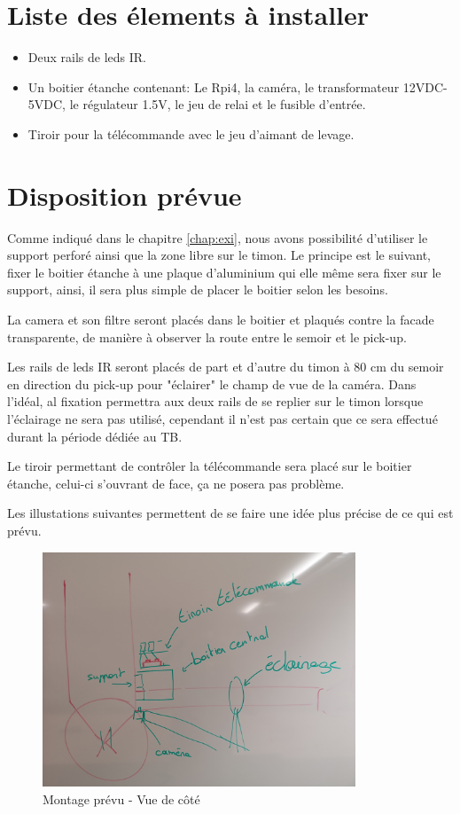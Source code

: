 \section{Liste des élements à installer}
\begin{itemize}
    \item Deux rails de leds IR.
    \item Un boitier étanche contenant: Le Rpi4, la caméra, le transformateur 12VDC-5VDC, le régulateur 1.5V, le jeu de relai et le fusible d'entrée.
    \item Tiroir pour la télécommande avec le jeu d'aimant de levage.
\end{itemize}
\section{Disposition prévue}
Comme indiqué dans le chapitre \ref{chap:exi}, nous avons possibilité d'utiliser le support perforé ainsi que la zone libre sur le timon.
Le principe est le suivant, fixer le boitier étanche à une plaque d'aluminium qui elle même sera fixer sur le support, ainsi, il sera plus simple
de placer le boitier selon les besoins.

La camera et son filtre seront placés dans le boitier et plaqués contre la facade transparente, de manière à observer la route entre le semoir
et le pick-up.

Les rails de leds IR seront placés de part et d'autre du timon à 80 \si{\centi\metre} du semoir en direction du pick-up pour "éclairer" le champ
de vue de la caméra. Dans l'idéal, al fixation permettra aux deux rails de se replier sur le timon lorsque l'éclairage ne sera pas utilisé,
cependant il n'est pas certain que ce sera effectué durant la période dédiée au TB.

Le tiroir permettant de contrôler la télécommande sera placé sur le boitier étanche, celui-ci s'ouvrant de face, ça ne posera pas problème.

Les illustations suivantes permettent de se faire une idée plus précise de ce qui est prévu.

\begin{figure}[H]
    \centering
    \includegraphics[height=7cm]{assets/figures/montage1.jpg}
    \caption{Montage prévu - Vue de côté}
\end{figure}

